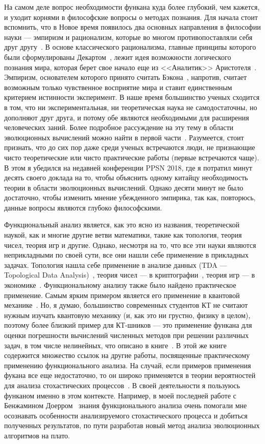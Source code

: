 \documentclass[russian]{article}
\begin{document}
На самом деле вопрос необходимости функана куда более глубокий, чем кажется, и уходит корнями в философские вопросы о методах познания. Для начала стоит вспомнить, что в Новое время появилось два основных направления в философии науки --- эмпиризм и рационализм, которые во многом противопоставляли себя друг другу~\cite{phil}. В основе классического рационализма, главные принципы которого были сформулированы Декартом~\cite{descartes}, лежит идея возможности логического познания мира, которая берет свое начало еще из <<Аналитик>> Аристотеля~\cite{aristotel}. Эмпиризм, основателем которого принято считать Бэкона~\cite{bacon}, напротив, считает возможным только чувственное восприятие мира и ставит единственным критерием истинности эксперимент. В наше время большинство ученых сходится в том, что ни экспериментальная, ни теоретическая наука не самодостаточны, но дополняют друг друга, и потому обе являются необходимыми для расширения человеческих заний. Более подробное рассуждение на эту тему в области эволюционных вычислений можно найти в первой части~\cite{doerr}. Разумеется, стоит признать, что до сих пор даже среди ученых встречаются люди, не признающие чисто теоретические или чисто практические работы (первые встречаются чаще). В этом я убедился на недавней конференции PPSN 2018, где я потратил минут десять своего доклада на то, чтобы объяснить одному китайцу необходимость теории в области эволюционных вычислений. Однако десяти минут не было достаточно, чтобы изменить мнение убежденного эмпирика, так как, повторюсь, данные вопросы являются глубоко философскими.

Функциональный анализ является, как это ясно из названия, теоретической наукой, как и многие другие ветви математики, такие как топология, теория чисел, теория игр и другие. Однако, несмотря на то, что все эти науки являются неприкладными по своей сути, все они нашли себе применение в прикладных задачах. Топология нашла себе применение в анализе данных (TDA --- Topological Data Analysis)~\cite{topology}, теория чисел --- в криптографии~\cite{numbers}, теория игр --- в экономике~\cite{games}. Функциональному анализу также было найдено практическое применение. Самым ярким примером является его применение в квантовой механике~\cite{quantum}. Но, я думаю, большинство современных студентов КТ не считают нужным изучать квантовую механику (и, как это ни грустно, физику в целом), поэтому более близкий пример для КТ-шников --- это применение функана для оценки погрешности вычислений численных методов при решении различных задач, в том числе нелинейных, что описано в книге~\cite{kollats}. В этой же книге содержится множество ссылок на другие работы, посвященные практическому применению функционального анализа. На случай, если примеров применения фукана все еще недостаточно, то он широко применяется в теории вероятностей для анализа стохастических процессов~\cite{prob}. В своей деятельности я пользуюсь функаном именно в этом контексте. Например, в моей последней работе с Бенжамином Доерром~\cite{plateau} знания функционального анализа очень помогали мне осознавать особенности анализируемого стохастического процесса и добиться полученных результатов, по пути разработав новый метод анализа эволюционных алгоритмов на плато.
\end{document}
